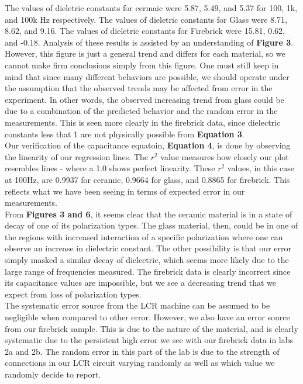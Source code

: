 \documentclass{article}
\begin{document}
The values of dieletric constants for cermaic were 5.87, 5.49, and 5.37 for 100, 1k, and 100k Hz respectively. The values of dieletric constants for Glass were 8.71, 8.62, and 9.16. The values of dieletric constants for Firebrick were 15.81, 0.62, and -0.18. Analysis of these results is assisted by an understanding of \textbf{Figure 3}. However, this figure is just a general trend and differs for each material, so we cannot make firm conclusions simply from this figure. One must still keep in mind that since many different behaviors are possible, we should operate under the assumption that the observed trends may be affected from error in the experiment. In other words, the observed increasing trend from glass could  be due to a combination of the predicted behavior and the random error in the measurements. This is seen more clearly in the firebrick data, since dielectric constants less that 1 are not physically possible from \textbf{Equation 3}.\\

Our verification of the capacitance equatoin, \textbf{Equation 4}, is done by observing the linearity of our regression lines. The $r^2$ value measures how closely our plot resembles lines - where a 1.0 shows perfect linearity. These $r^2$ values, in this case at 100Hz, are 0.9937 for ceramic, 0.9664 for glass, and 0.8865 for firebrick. This reflects what we have been seeing in terms of expected error in our measurements.\\

From \textbf{Figures 3 and 6}, it seems clear that the ceramic material is in a state of decay of one of its polarization types. The glass material, then, could be in one of the regions with increased interaction of a specific polarization where one can observe an increase in dielectric constant. The other possibility is that our error simply masked a similar decay of dielectric, which seems more likely due to the large range of frequencies measured. The firebrick data is clearly incorrect since its capacitance values are impossible, but we see a decreasing trend that we expect from loss of polarization types.\\

The systematic error source from the LCR machine can be assumed to be negligible when compared to other error. However, we also have an error source from our firebrick sample. This is due to the nature of the material, and is clearly systematic due to the persistent high error we see with our firebrick data in labs 2a and 2b. The random error in this part of the lab is due to the strength of connections in our LCR circuit varying randomly as well as which value we randomly decide to report.\\
\end{document}

